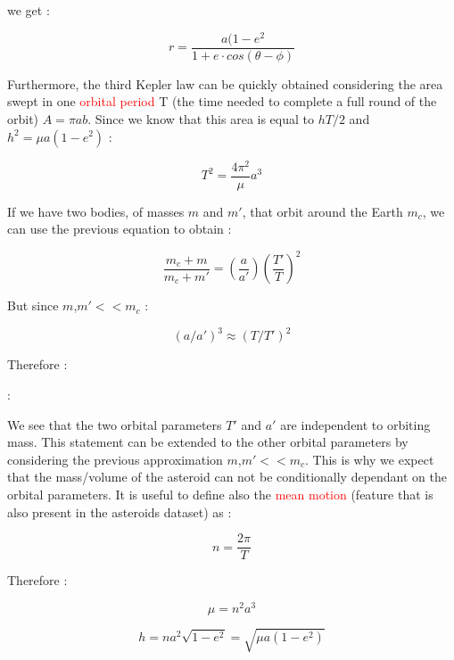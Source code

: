 \documentclass[12pt,%
               a4paper,%
               oneside,openany,%
               titlepage,%
               headinclude,footinclude,%
               BCOR5mm,%
               cleardoublepage=empty,%
               tablecaptionabove,%
               floatperchapter,
               ]{scrreprt}                 %
\begin{document}
we get \cite{murray1999solar}:

\begin{equation}
r=\frac{a(1-e^{2}}{1+e\cdot cos(\theta-\phi)}
\label{eq-mot}
\end{equation}

Furthermore, the third Kepler law can be quickly obtained considering the area swept in one \textcolor{red}{orbital period} T (the time needed to complete a full round of the orbit) $A=\pi ab$. Since we know that this area is equal to $hT/2$ and $h^{2}=\mu a(1-e^{2})$ \cite{murray1999solar}:

\begin{equation}
T^{2}=\dfrac{4\pi^{2}}{\mu}a^{3}
\end{equation}

If we have two bodies, of masses $m$ and $m'$, that orbit around the Earth $m_{c}$, we can use the previous equation to obtain \cite{murray1999solar}:

\begin{equation}
\frac{m_{c}+m}{m_{c}+m'}=\left(\frac{a}{a'}\right)\left(\frac{T'}{T}\right)^{2}
\end{equation}

But since $m$,$m'<<m_{c}$ \cite{murray1999solar}:

\begin{equation}
(a/a')^{3}\approx(T/T')^{2}
\end{equation}

Therefore \cite{murray1999solar}:

\cite{murray1999solar}:

We see that the two orbital parameters $T'$ and $a'$ are independent to orbiting mass. This statement can be extended to the other orbital parameters by considering the previous approximation $m$,$m'<<m_{c}$. This is why we expect that the mass/volume of the asteroid can not be conditionally dependant on the orbital parameters. It is useful to define also the \textcolor{red}{mean motion} (feature that is also present in the asteroids dataset) as \cite{murray1999solar}:

\begin{equation}
n=\frac{2\pi}{T}
\end{equation}

Therefore \cite{murray1999solar}:

\begin{equation}
\mu=n^{2}a^{3}
\end{equation}

\begin{equation}
h=na^{2}\sqrt{1-e^{2}}=\sqrt{\mu a(1-e^{2})}
\label{eq_h}
\end{equation}
\end{document}
